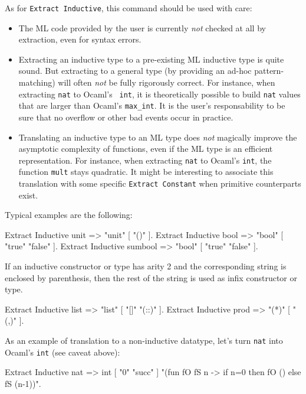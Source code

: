 As for {\tt Extract Inductive}, this command should be used with care:
\begin{itemize}
\item The ML code provided by the user is currently \emph{not} checked at all by
  extraction, even for syntax errors.

\item Extracting an inductive type to a pre-existing ML inductive type
is quite sound. But extracting to a general type (by providing an
ad-hoc pattern-matching) will often \emph{not} be fully rigorously
correct.  For instance, when extracting {\tt nat} to Ocaml's {\tt
int}, it is theoretically possible to build {\tt nat} values that are
larger than Ocaml's {\tt max\_int}. It is the user's responsability to
be sure that no overflow or other bad events occur in practice.

\item Translating an inductive type to an ML type does \emph{not}
magically improve the asymptotic complexity of functions, even if the
ML type is an efficient representation. For instance, when extracting
{\tt nat} to Ocaml's {\tt int}, the function {\tt mult} stays
quadratic. It might be interesting to associate this translation with
some specific {\tt Extract Constant} when primitive counterparts exist.
\end{itemize}

\Example
Typical examples are the following:
\begin{coq_example}
Extract Inductive unit => "unit" [ "()" ].
Extract Inductive bool => "bool" [ "true" "false" ].
Extract Inductive sumbool => "bool" [ "true" "false" ].
\end{coq_example}

If an inductive constructor or type has arity 2 and the corresponding 
string is enclosed by parenthesis, then the rest of the string is used
as infix constructor or type. 
\begin{coq_example}
Extract Inductive list => "list" [ "[]" "(::)" ].
Extract Inductive prod => "(*)"  [ "(,)" ].
\end{coq_example}

As an example of translation to a non-inductive datatype, let's turn
{\tt nat} into Ocaml's {\tt int} (see caveat above):
\begin{coq_example}
Extract Inductive nat => int [ "0" "succ" ]
 "(fun fO fS n -> if n=0 then fO () else fS (n-1))".
\end{coq_example}



